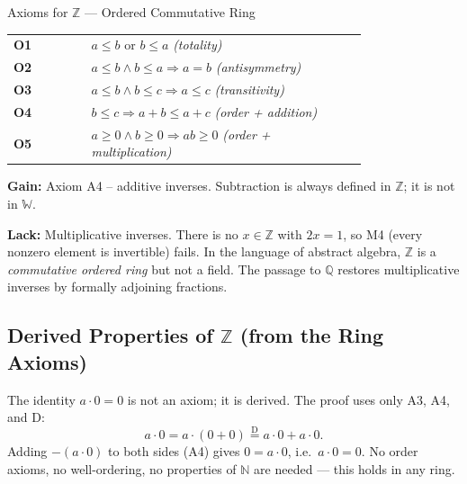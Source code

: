 \begin{topicbox}{Axioms for $\mathbb{Z}$ --- Ordered Commutative Ring}
\begin{exposition}
\medskip
\begin{tabular}{@{} l p{0.78\linewidth} @{}}
\textbf{O1} & $a \leq b$ or $b \leq a$ \hfill\textit{(totality)} \\[3pt]
\textbf{O2} & $a \leq b \land b \leq a \Rightarrow a = b$
             \hfill\textit{(antisymmetry)} \\[3pt]
\textbf{O3} & $a \leq b \land b \leq c \Rightarrow a \leq c$
             \hfill\textit{(transitivity)} \\[3pt]
\textbf{O4} & $b \leq c \Rightarrow a + b \leq a + c$
             \hfill\textit{(order + addition)} \\[3pt]
\textbf{O5} & $a \geq 0 \land b \geq 0 \Rightarrow ab \geq 0$
             \hfill\textit{(order + multiplication)} \\
\end{tabular}
\end{exposition}
\end{topicbox}

\begin{remark*}
\textbf{Gain:} Axiom A4 -- additive inverses. Subtraction is always defined
in $\mathbb{Z}$; it is not in $\mathbb{W}$.

\textbf{Lack:} Multiplicative inverses. There is no $x \in \mathbb{Z}$
with $2x = 1$, so M4 (every nonzero element is invertible) fails.
In the language of abstract algebra, $\mathbb{Z}$ is a
\emph{commutative ordered ring} but not a field.
The passage to $\mathbb{Q}$ restores multiplicative inverses by formally
adjoining fractions.
\end{remark*}

\subsection*{\texorpdfstring{Derived Properties of $\mathbb{Z}$ (from the Ring Axioms)}{Derived Properties of Z (from the Ring Axioms)}}

\begin{remark*}
The identity $a \cdot 0 = 0$ is not an axiom; it is derived.
The proof uses only A3, A4, and D:
\[
a \cdot 0
= a \cdot (0 + 0)
\overset{\text{D}}{=} a \cdot 0 + a \cdot 0.
\]
Adding $-(a \cdot 0)$ to both sides (A4) gives $0 = a \cdot 0$, i.e.\ $a \cdot 0 = 0$.
No order axioms, no well-ordering, no properties of $\mathbb{N}$ are needed ---
this holds in any ring.
\end{remark*}

